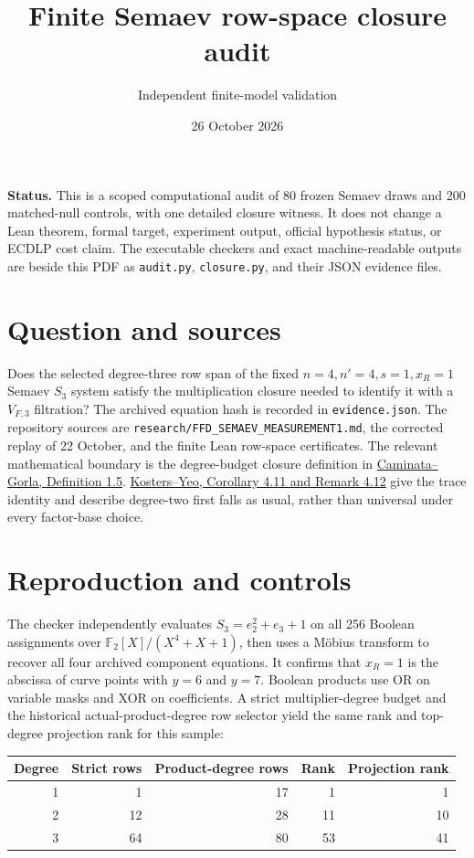 \documentclass[10pt]{article}
\title{Finite Semaev row-space closure audit}
\author{Independent finite-model validation}
\date{26 October 2026}
\begin{document}
\maketitle
\small

\noindent\textbf{Status.} This is a scoped computational audit of 80 frozen
Semaev draws and 200 matched-null controls, with one detailed closure witness.
It does not change a Lean theorem, formal target, experiment
output, official hypothesis status, or ECDLP cost claim. The executable
checkers and exact machine-readable outputs are beside this PDF as
\texttt{audit.py}, \texttt{closure.py}, and their JSON evidence files.

\section*{Question and sources}
Does the selected degree-three row span of the fixed
$n=4,n'=4,s=1,x_R=1$ Semaev $S_3$ system satisfy the multiplication closure
needed to identify it with a $V_{F,3}$ filtration? The archived equation hash
is recorded in \texttt{evidence.json}. The repository sources are
\texttt{research/FFD\_SEMAEV\_MEASUREMENT1.md}, the corrected replay of
22 October, and the finite Lean row-space certificates. The relevant
mathematical boundary is the degree-budget closure definition in
\href{https://arxiv.org/pdf/2112.05579}{Caminata--Gorla, Definition 1.5}.
\href{https://arxiv.org/pdf/1503.08001}{Kosters--Yeo, Corollary 4.11 and
Remark 4.12} give the trace identity and describe degree-two first falls as
usual, rather than universal under every factor-base choice.

\section*{Reproduction and controls}
The checker independently evaluates $S_3=e_2^2+e_3+1$ on all 256 Boolean
assignments over $\mathbb{F}_2[X]/(X^4+X+1)$, then uses a M\"obius transform
to recover all four archived component equations. It confirms that $x_R=1$
is the abscissa of curve points with $y=6$ and $y=7$. Boolean products use
OR on variable masks and XOR on coefficients. A strict multiplier-degree
budget and the historical actual-product-degree row selector yield the same
rank and top-degree projection rank for this sample:

\begin{center}
\begin{tabular}{rrrrr}
\toprule
Degree & Strict rows & Product-degree rows & Rank & Projection rank\\
\midrule
1 & 1 & 17 & 1 & 1\\
2 & 12 & 28 & 11 & 10\\
3 & 64 & 80 & 53 & 41\\
\bottomrule
\end{tabular}
\end{center}
\end{document}
